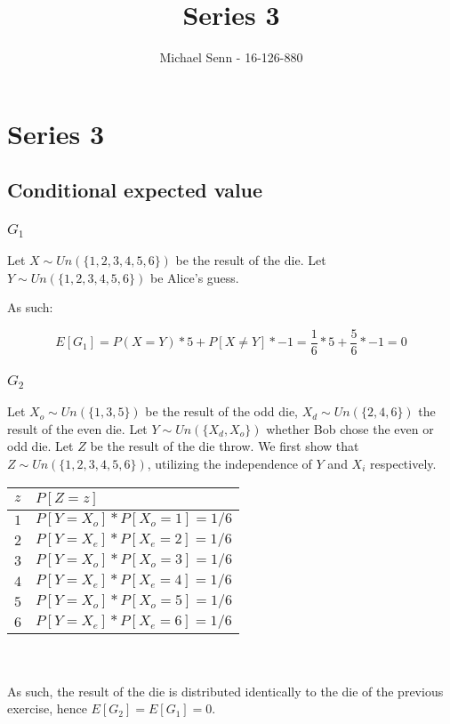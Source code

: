 \documentclass[a4paper]{scrreprt}
\title{Series 3}
\author{Michael Senn \maillink{michael.senn@students.unibe.ch} - 16-126-880}
\date{\printdate}
\begin{document}
\maketitle


\setcounter{chapter}{2}
\chapter{Series 3}

\section{Conditional expected value}

\subsection{$G_1$}

Let $X \sim Un(\{1, 2, 3, 4, 5, 6\})$ be the result of the die. Let $Y \sim
Un(\{1, 2, 3, 4, 5, 6\})$ be Alice's guess.

As such:

\[
	E[G_1] = P(X=Y) * 5 + P[X \neq Y] * -1 = \frac{1}{6} * 5 + \frac{5}{6} * -1 = 0
\]

\subsection{$G_2$}

Let $X_o \sim Un(\{1, 3, 5\})$ be the result of the odd die, $X_d \sim Un(\{2,
4, 6\})$ the result of the even die. Let $Y \sim Un(\{X_d, X_o\})$ whether Bob
chose the even or odd die. Let $Z$ be the result of the die throw. We first
show that $Z \sim Un(\{1, 2, 3, 4, 5, 6\})$, utilizing the independence of $Y$
and $X_i$ respectively.
\\

\begin{tabular}{|l|l|}
	\hline
	$z$ & $P[Z = z]$  \\
	\hline
	$1$ & $P[Y = X_o] * P[X_o = 1] = 1/6$ \\
	\hline
	$2$ & $P[Y = X_e] * P[X_e = 2] = 1/6$ \\
	\hline
	$3$ & $P[Y = X_o] * P[X_o = 3] = 1/6$ \\
	\hline
	$4$ & $P[Y = X_e] * P[X_e = 4] = 1/6$ \\
	\hline
	$5$ & $P[Y = X_o] * P[X_o = 5] = 1/6$ \\
	\hline
	$6$ & $P[Y = X_e] * P[X_e = 6] = 1/6$ \\
	\hline
\end{tabular}
\\
\\
As such, the result of the die is distributed identically to the die of the
previous exercise, hence $E[G_2] = E[G_1] = 0$.
\end{document}
